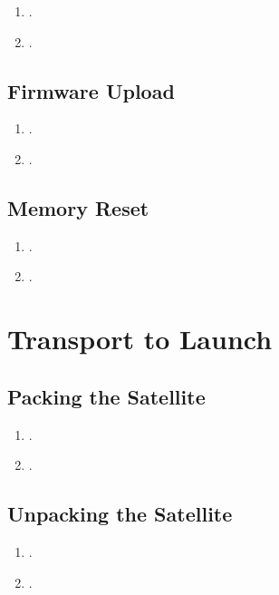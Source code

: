 \begin{enumerate}
    \item .
    \item .
\end{enumerate}

\subsection{Firmware Upload}

\begin{enumerate}
    \item .
    \item .
\end{enumerate}

\subsection{Memory Reset}

\begin{enumerate}
    \item .
    \item .
\end{enumerate}

\section{Transport to Launch}

\subsection{Packing the Satellite}

\begin{enumerate}
    \item .
    \item .
\end{enumerate}

\subsection{Unpacking the Satellite}

\begin{enumerate}
    \item .
    \item .
\end{enumerate}
